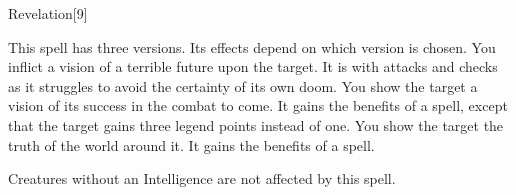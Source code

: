 \begin{spellsection}{Revelation}[9]
    \begin{spellheader}
    \end{spellheader}
    \begin{spellcontent}
        \begin{spelltargetinginfo}
        \end{spelltargetinginfo}
        \begin{spelleffects}
            \spellspecial This spell has three versions. Its effects depend on which version is chosen.
             You inflict a vision of a terrible future upon the target. It is \severelyimpaired with attacks and checks as it struggles to avoid the certainty of its own doom.
             You show the target a vision of its success in the combat to come. It gains the benefits of a  spell, except that the target gains three legend points instead of one.
             You show the target the truth of the world around it. It gains the benefits of a  spell.
            \spelldur \durshort
        \end{spelleffects}
    \end{spellcontent}
    \begin{spellfooter}
        \spellnotes Creatures without an Intelligence are not affected by this spell.
        \miscastrandom
    \end{spellfooter}
\end{spellsection}

